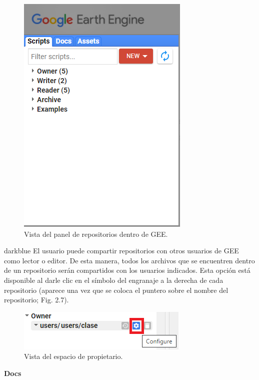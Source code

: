 \documentclass[
  12pt,
  letterpaper,
  twoside]{book}
\begin{document}
\begin{figure}[btp]

{\centering \includegraphics[width=0.4\linewidth]{Img/left_panel} 

}

\caption{Vista del panel de repositorios dentro de GEE.}\label{fig:unnamed-chunk-7}
\end{figure}

\begin{bluebox2}

\begin{awesomeblock}{5pt}{\faLightbulb}{darkblue}
El usuario puede compartir repositorios con otros usuarios de GEE como lector o editor. De esta manera, todos los archivos que se encuentren dentro de un repositorio serán compartidos con los usuarios indicados. Esta opción está disponible al darle clic en el símbolo del engranaje a la derecha de cada repositorio (aparece una vez que se coloca el puntero sobre el nombre del repositorio; Fig. 2.7).

\end{awesomeblock}

\end{bluebox2}

\begin{figure}[btp]

{\centering \includegraphics[width=0.4\linewidth]{Img/engranaje} 

}

\caption{Vista del espacio de propietario.}\label{fig:unnamed-chunk-8}
\end{figure}

\textbf{Docs}
\end{document}
